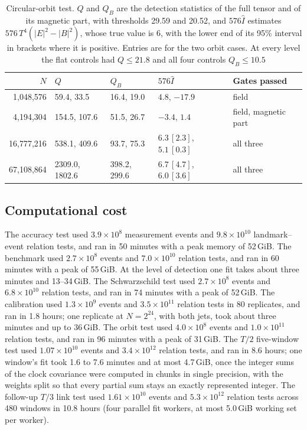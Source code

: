 \documentclass[11pt,a4paper]{article}
\begin{document}
\begin{table}[t]
\centering\small
\caption{Circular-orbit test. $Q$ and $Q_B$ are the detection statistics of
the full tensor and of its magnetic part, with thresholds 29.59 and 20.52,
and $576\hat I$ estimates $576\,T^4(|E|^2-|B|^2)$, whose true value is 6,
with the lower end of its 95\% interval in brackets where it is positive.
Entries are for the two orbit cases. At every level the flat controls had
$Q\le21.8$ and all four controls $Q_B\le10.5$}
\label{orbittable}
\begin{tabular}{rllll}
\toprule
$N$ & $Q$ & $Q_B$ & $576\hat I$ & Gates passed\\
\midrule
1,048,576 & 59.4, 33.5 & 16.4, 19.0 & $4.8$, $-17.9$ & field\\
4,194,304 & 154.5, 107.6 & 51.5, 26.7 & $-3.4$, $1.4$ & field, magnetic part\\
16,777,216 & 538.1, 409.6 & 93.7, 75.3 & $6.3\,[2.3]$, $5.1\,[0.3]$ & all three\\
67,108,864 & 2309.0, 1802.6 & 398.2, 299.6 & $6.7\,[4.7]$, $6.0\,[3.6]$ & all three\\
\bottomrule
\end{tabular}
\end{table}

\subsection{Computational cost}
The accuracy test used $3.9\times10^8$ measurement events and
$9.8\times10^{10}$ landmark--event relation tests, and ran in 50 minutes
with a peak memory of 52\,GiB. The benchmark used $2.7\times10^8$ events and
$7.0\times10^{10}$ relation tests, and ran in 60 minutes with a peak of
55\,GiB. At the level of detection one fit takes about three minutes and
13--34\,GiB. The Schwarzschild test used $2.7\times10^8$ events and
$6.8\times10^{10}$ relation tests, and ran in 74 minutes with a peak of
52\,GiB. The calibration used $1.3\times10^9$ events and
$3.5\times10^{11}$ relation tests in 80 replicates, and ran in 1.8 hours;
one replicate at $N=2^{24}$, with both jets, took about three minutes and up
to 36\,GiB. The orbit test used $4.0\times10^8$ events and
$1.0\times10^{11}$ relation tests, and ran in 96 minutes with a peak of
31\,GiB. The $T/2$ five-window test used $1.07\times10^{10}$ events and
$3.4\times10^{12}$ relation tests, and ran in 8.6 hours; one window's fit
took 1.6 to 7.6 minutes and at most 4.7\,GiB, once the integer sums of the
clock covariance were computed in chunks in single precision, with the
weights split so that every partial sum stays an exactly represented
integer. The follow-up $T/3$ link test used $1.61\times10^{10}$ events
and $5.3\times10^{12}$ relation tests across 480 windows in 10.8 hours
(four parallel fit workers, at most 5.0\,GiB working set per worker).
\end{document}
